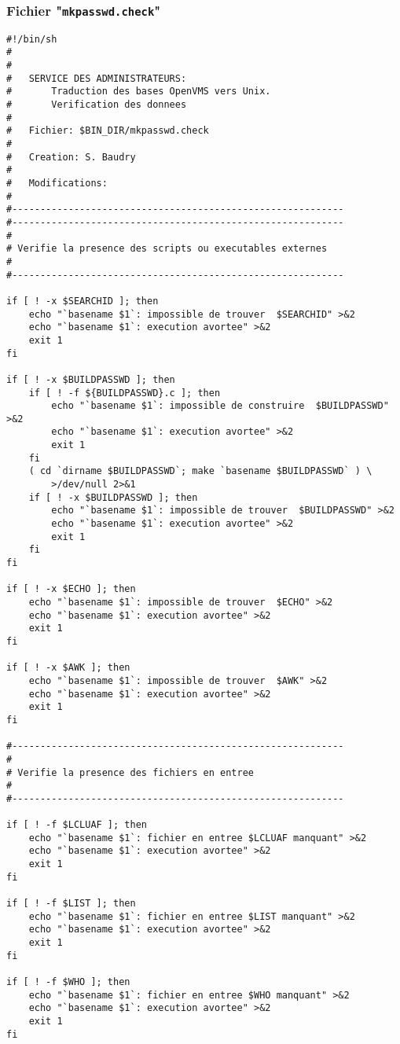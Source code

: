 \subsubsection{\label{adv-programming-ex3-pgmchk}Fichier "{\tt mkpasswd.check}"}

\begin{verbatim}
#!/bin/sh
#
#
#   SERVICE DES ADMINISTRATEURS:
#       Traduction des bases OpenVMS vers Unix.
#       Verification des donnees
#
#   Fichier: $BIN_DIR/mkpasswd.check
#
#   Creation: S. Baudry
#
#   Modifications:
#
#-----------------------------------------------------------
#-----------------------------------------------------------
#
# Verifie la presence des scripts ou executables externes
#
#-----------------------------------------------------------

if [ ! -x $SEARCHID ]; then
    echo "`basename $1`: impossible de trouver  $SEARCHID" >&2
    echo "`basename $1`: execution avortee" >&2
    exit 1
fi

if [ ! -x $BUILDPASSWD ]; then
    if [ ! -f ${BUILDPASSWD}.c ]; then
        echo "`basename $1`: impossible de construire  $BUILDPASSWD" >&2
        echo "`basename $1`: execution avortee" >&2
        exit 1
    fi
    ( cd `dirname $BUILDPASSWD`; make `basename $BUILDPASSWD` ) \
        >/dev/null 2>&1
    if [ ! -x $BUILDPASSWD ]; then
        echo "`basename $1`: impossible de trouver  $BUILDPASSWD" >&2
        echo "`basename $1`: execution avortee" >&2
        exit 1
    fi
fi

if [ ! -x $ECHO ]; then
    echo "`basename $1`: impossible de trouver  $ECHO" >&2
    echo "`basename $1`: execution avortee" >&2
    exit 1
fi

if [ ! -x $AWK ]; then
    echo "`basename $1`: impossible de trouver  $AWK" >&2
    echo "`basename $1`: execution avortee" >&2
    exit 1
fi

#-----------------------------------------------------------
#
# Verifie la presence des fichiers en entree
#
#-----------------------------------------------------------

if [ ! -f $LCLUAF ]; then
    echo "`basename $1`: fichier en entree $LCLUAF manquant" >&2
    echo "`basename $1`: execution avortee" >&2
    exit 1
fi

if [ ! -f $LIST ]; then
    echo "`basename $1`: fichier en entree $LIST manquant" >&2
    echo "`basename $1`: execution avortee" >&2
    exit 1
fi

if [ ! -f $WHO ]; then
    echo "`basename $1`: fichier en entree $WHO manquant" >&2
    echo "`basename $1`: execution avortee" >&2
    exit 1
fi


\end{verbatim}

